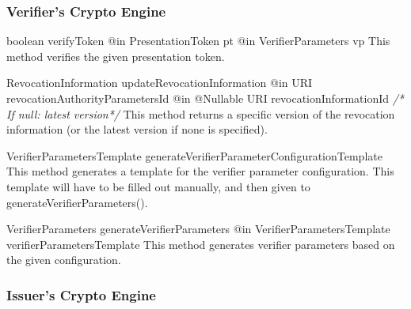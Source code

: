       
      



  \subsubsection{Verifier's Crypto Engine}
  
      \begin{method}
      {boolean}
      {verifyToken}
      {
        {@in PresentationToken pt}
        {@in VerifierParameters vp}
      }
      This method verifies the given presentation token.
      \end{method}
      
      \begin{method}
      {RevocationInformation}
      {updateRevocationInformation}
      {
        {@in URI revocationAuthorityParametersId}
        {@in @Nullable URI revocationInformationId \textrm{\textit{/* If null: latest version*/}}}
      }
      This method returns a specific version of the revocation information (or the latest version
      if none is specified).
      \end{method}
      
      \begin{method}
      {VerifierParametersTemplate}
      {generateVerifierParameterConfigurationTemplate}
      {
      }
      This method generates a template for the verifier parameter configuration.
      This template will have to be filled out manually, and then given to generateVerifierParameters().
      \end{method}
      
      \begin{method}
      {VerifierParameters}
      {generateVerifierParameters}
      {
        {@in VerifierParametersTemplate verifierParametersTemplate}
      }
      This method generates verifier parameters based on the given configuration.
      \end{method}
      
      
      



  \subsubsection{Issuer's Crypto Engine}

